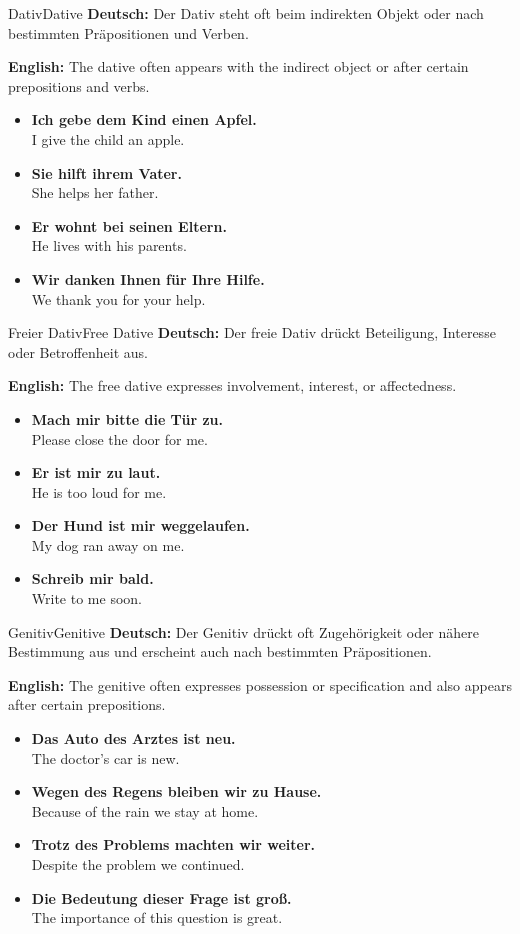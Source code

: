 \documentclass[a4paper,11pt]{article}
\newcommand{\GermanText}[1]{\textbf{Deutsch: }#1\par}
\newcommand{\EnglishText}[1]{{\color{SoftGray}\textbf{English: }#1\par}}
\newcommand{\ExampleItem}[2]{\item \textbf{#1}\\{\color{SoftGray}#2}}
\begin{document}
\begin{grammarentry}{Dativ}{Dative}
    \GermanText{Der Dativ steht oft beim indirekten Objekt oder nach bestimmten Präpositionen und Verben.}
    \EnglishText{The dative often appears with the indirect object or after certain prepositions and verbs.}
    \begin{exbox}
        \begin{itemize}
            \ExampleItem{Ich gebe dem Kind einen Apfel.}{I give the child an apple.}
            \ExampleItem{Sie hilft ihrem Vater.}{She helps her father.}
            \ExampleItem{Er wohnt bei seinen Eltern.}{He lives with his parents.}
            \ExampleItem{Wir danken Ihnen für Ihre Hilfe.}{We thank you for your help.}
        \end{itemize}
    \end{exbox}
\end{grammarentry}

\begin{grammarentry}{Freier Dativ}{Free Dative}
    \GermanText{Der freie Dativ drückt Beteiligung, Interesse oder Betroffenheit aus.}
    \EnglishText{The free dative expresses involvement, interest, or affectedness.}
    \begin{exbox}
        \begin{itemize}
            \ExampleItem{Mach mir bitte die Tür zu.}{Please close the door for me.}
            \ExampleItem{Er ist mir zu laut.}{He is too loud for me.}
            \ExampleItem{Der Hund ist mir weggelaufen.}{My dog ran away on me.}
            \ExampleItem{Schreib mir bald.}{Write to me soon.}
        \end{itemize}
    \end{exbox}
\end{grammarentry}

\begin{grammarentry}{Genitiv}{Genitive}
    \GermanText{Der Genitiv drückt oft Zugehörigkeit oder nähere Bestimmung aus und erscheint auch nach bestimmten Präpositionen.}
    \EnglishText{The genitive often expresses possession or specification and also appears after certain prepositions.}
    \begin{exbox}
        \begin{itemize}
            \ExampleItem{Das Auto des Arztes ist neu.}{The doctor's car is new.}
            \ExampleItem{Wegen des Regens bleiben wir zu Hause.}{Because of the rain we stay at home.}
            \ExampleItem{Trotz des Problems machten wir weiter.}{Despite the problem we continued.}
            \ExampleItem{Die Bedeutung dieser Frage ist groß.}{The importance of this question is great.}
        \end{itemize}
    \end{exbox}
\end{grammarentry}
\end{document}
